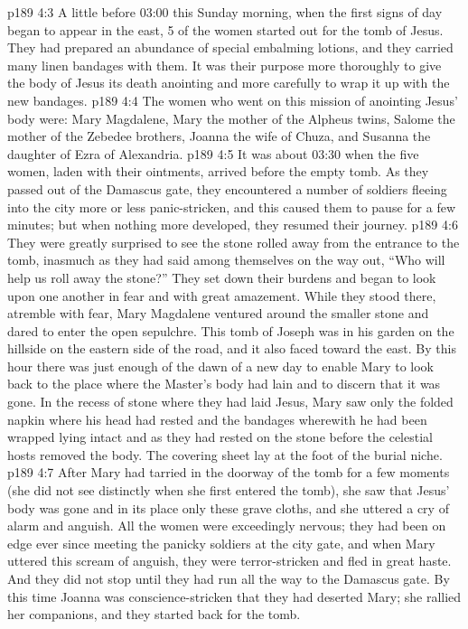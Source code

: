 \vs p189 4:3 A little before 03:00 this Sunday morning, when the first signs of day began to appear in the east, 5 of the women started out for the tomb of Jesus. They had prepared an abundance of special embalming lotions, and they carried many linen bandages with them. It was their purpose more thoroughly to give the body of Jesus its death anointing and more carefully to wrap it up with the new bandages.
\vs p189 4:4 The women who went on this mission of anointing Jesus’ body were: Mary Magdalene, Mary the mother of the Alpheus twins, Salome the mother of the Zebedee brothers, Joanna the wife of Chuza, and Susanna the daughter of Ezra of Alexandria.
\vs p189 4:5 It was about 03:30 when the five women, laden with their ointments, arrived before the empty tomb. As they passed out of the Damascus gate, they encountered a number of soldiers fleeing into the city more or less panic\hyp{}stricken, and this caused them to pause for a few minutes; but when nothing more developed, they resumed their journey.
\vs p189 4:6 They were greatly surprised to see the stone rolled away from the entrance to the tomb, inasmuch as they had said among themselves on the way out, “Who will help us roll away the stone?” They set down their burdens and began to look upon one another in fear and with great amazement. While they stood there, atremble with fear, Mary Magdalene ventured around the smaller stone and dared to enter the open sepulchre. This tomb of Joseph was in his garden on the hillside on the eastern side of the road, and it also faced toward the east. By this hour there was just enough of the dawn of a new day to enable Mary to look back to the place where the Master’s body had lain and to discern that it was gone. In the recess of stone where they had laid Jesus, Mary saw only the folded napkin where his head had rested and the bandages wherewith he had been wrapped lying intact and as they had rested on the stone before the celestial hosts removed the body. The covering sheet lay at the foot of the burial niche.
\vs p189 4:7 After Mary had tarried in the doorway of the tomb for a few moments (she did not see distinctly when she first entered the tomb), she saw that Jesus’ body was gone and in its place only these grave cloths, and she uttered a cry of alarm and anguish. All the women were exceedingly nervous; they had been on edge ever since meeting the panicky soldiers at the city gate, and when Mary uttered this scream of anguish, they were terror\hyp{}stricken and fled in great haste. And they did not stop until they had run all the way to the Damascus gate. By this time Joanna was conscience\hyp{}stricken that they had deserted Mary; she rallied her companions, and they started back for the tomb.
